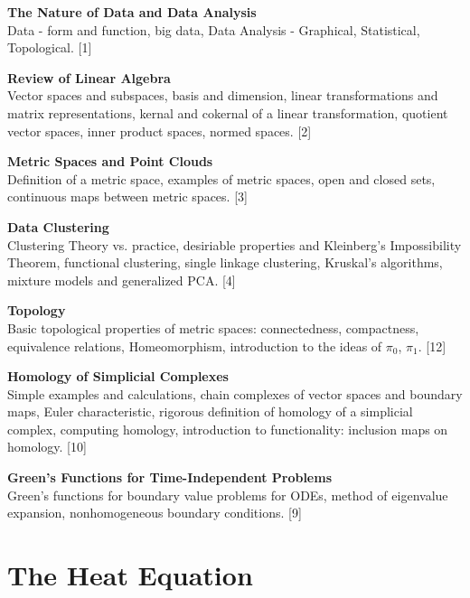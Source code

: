 \documentclass{article}
\begin{document}
\maketitle
{\small
  \noindent\textbf{The Nature of Data and Data Analysis}\\
  Data - form and function, big data, Data Analysis - Graphical, Statistical, Topological.\hspace*{\fill} [1]

  \vspace{10pt}
  \noindent\textbf{Review of Linear Algebra}\\
  Vector spaces and subspaces, basis and dimension, linear transformations and matrix representations, kernal and cokernal of a linear transformation, quotient vector spaces, inner product spaces, normed spaces.\hspace*{\fill} [2]

  \vspace{10pt}
  \noindent\textbf{Metric Spaces and Point Clouds}\\
  Definition of a metric space, examples of metric spaces, open and closed sets, continuous maps between metric spaces.\hspace*{\fill} [3]

  \vspace{10pt}
  \noindent\textbf{Data Clustering}\\
  Clustering Theory vs. practice, desiriable properties and Kleinberg's Impossibility Theorem, functional clustering, single linkage clustering, Kruskal's algorithms, mixture models and generalized PCA.\hspace*{\fill} [4]

  \vspace{10pt}
  \noindent\textbf{Topology}\\
  Basic topological properties of metric spaces: connectedness, compactness, equivalence relations, Homeomorphism, introduction to the ideas of $\pi_0$, $\pi_1$.\hspace*{\fill} [12]

  \vspace{10pt}
  \noindent\textbf{Homology of Simplicial Complexes}\\
  Simple examples and calculations, chain complexes of vector spaces and boundary maps, Euler characteristic, rigorous definition of homology of a simplicial complex, computing homology, introduction to functionality: inclusion maps on homology.\hspace*{\fill} [10]

  \vspace{10pt}
  \noindent\textbf{Green’s Functions for Time-Independent Problems}\\
  Green's functions for boundary value problems for ODEs, method of eigenvalue expansion, nonhomogeneous boundary conditions.\hspace*{\fill} [9]}

\tableofcontents


	\section{The Heat Equation}
\end{document}
